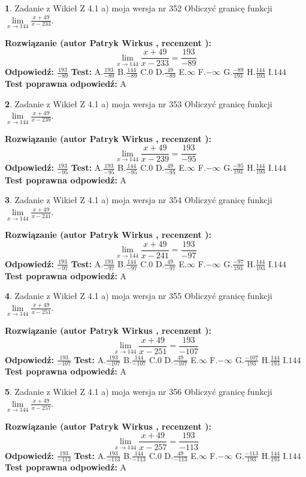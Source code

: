 \documentclass[12pt, a4paper]{article}
\theoremstyle{definition} %
\newtheorem{zad}{}
\newcommand{\zadStart}[1]{\begin{zad}#1\newline}
\newcommand{\zadStop}{\end{zad}}
\newcommand{\rozwStart}[2]{\noindent \textbf{Rozwiązanie (autor #1 , recenzent #2): }\newline}
\newcommand{\rozwStop}{\newline}
\newcommand{\odpStart}{\noindent \textbf{Odpowiedź:}\newline}
\newcommand{\odpStop}{\newline}
\newcommand{\testStart}{\noindent \textbf{Test:}\newline}
\newcommand{\testStop}{\newline}
\newcommand{\kluczStart}{\noindent \textbf{Test poprawna odpowiedź:}\newline}
\newcommand{\kluczStop}{\newline}
\begin{document}
\zadStart{Zadanie z Wikieł Z 4.1 a) moja wersja nr 352}
Obliczyć granicę funkcji $\lim\limits_{x\to144}\frac{x+49}{x-233}$.
\zadStop
\rozwStart{Patryk Wirkus}{}
$$\lim\limits_{x\to144}\frac{x+49}{x-233} = \frac{193}{-89}$$
\rozwStop
\odpStart
$\frac{193}{-89}$
\odpStop
\testStart
A.$\frac{193}{-89}$
B.$\frac{144}{-89}$
C.$0$
D.$\frac{49}{-89}$
E.$\infty$
F.$-\infty$
G.$\frac{-89}{193}$
H.$\frac{144}{193}$
I.$144$
\testStop
\kluczStart
A
\kluczStop



\zadStart{Zadanie z Wikieł Z 4.1 a) moja wersja nr 353}
Obliczyć granicę funkcji $\lim\limits_{x\to144}\frac{x+49}{x-239}$.
\zadStop
\rozwStart{Patryk Wirkus}{}
$$\lim\limits_{x\to144}\frac{x+49}{x-239} = \frac{193}{-95}$$
\rozwStop
\odpStart
$\frac{193}{-95}$
\odpStop
\testStart
A.$\frac{193}{-95}$
B.$\frac{144}{-95}$
C.$0$
D.$\frac{49}{-95}$
E.$\infty$
F.$-\infty$
G.$\frac{-95}{193}$
H.$\frac{144}{193}$
I.$144$
\testStop
\kluczStart
A
\kluczStop



\zadStart{Zadanie z Wikieł Z 4.1 a) moja wersja nr 354}
Obliczyć granicę funkcji $\lim\limits_{x\to144}\frac{x+49}{x-241}$.
\zadStop
\rozwStart{Patryk Wirkus}{}
$$\lim\limits_{x\to144}\frac{x+49}{x-241} = \frac{193}{-97}$$
\rozwStop
\odpStart
$\frac{193}{-97}$
\odpStop
\testStart
A.$\frac{193}{-97}$
B.$\frac{144}{-97}$
C.$0$
D.$\frac{49}{-97}$
E.$\infty$
F.$-\infty$
G.$\frac{-97}{193}$
H.$\frac{144}{193}$
I.$144$
\testStop
\kluczStart
A
\kluczStop



\zadStart{Zadanie z Wikieł Z 4.1 a) moja wersja nr 355}
Obliczyć granicę funkcji $\lim\limits_{x\to144}\frac{x+49}{x-251}$.
\zadStop
\rozwStart{Patryk Wirkus}{}
$$\lim\limits_{x\to144}\frac{x+49}{x-251} = \frac{193}{-107}$$
\rozwStop
\odpStart
$\frac{193}{-107}$
\odpStop
\testStart
A.$\frac{193}{-107}$
B.$\frac{144}{-107}$
C.$0$
D.$\frac{49}{-107}$
E.$\infty$
F.$-\infty$
G.$\frac{-107}{193}$
H.$\frac{144}{193}$
I.$144$
\testStop
\kluczStart
A
\kluczStop



\zadStart{Zadanie z Wikieł Z 4.1 a) moja wersja nr 356}
Obliczyć granicę funkcji $\lim\limits_{x\to144}\frac{x+49}{x-257}$.
\zadStop
\rozwStart{Patryk Wirkus}{}
$$\lim\limits_{x\to144}\frac{x+49}{x-257} = \frac{193}{-113}$$
\rozwStop
\odpStart
$\frac{193}{-113}$
\odpStop
\testStart
A.$\frac{193}{-113}$
B.$\frac{144}{-113}$
C.$0$
D.$\frac{49}{-113}$
E.$\infty$
F.$-\infty$
G.$\frac{-113}{193}$
H.$\frac{144}{193}$
I.$144$
\testStop
\kluczStart
A
\kluczStop
\end{document}
